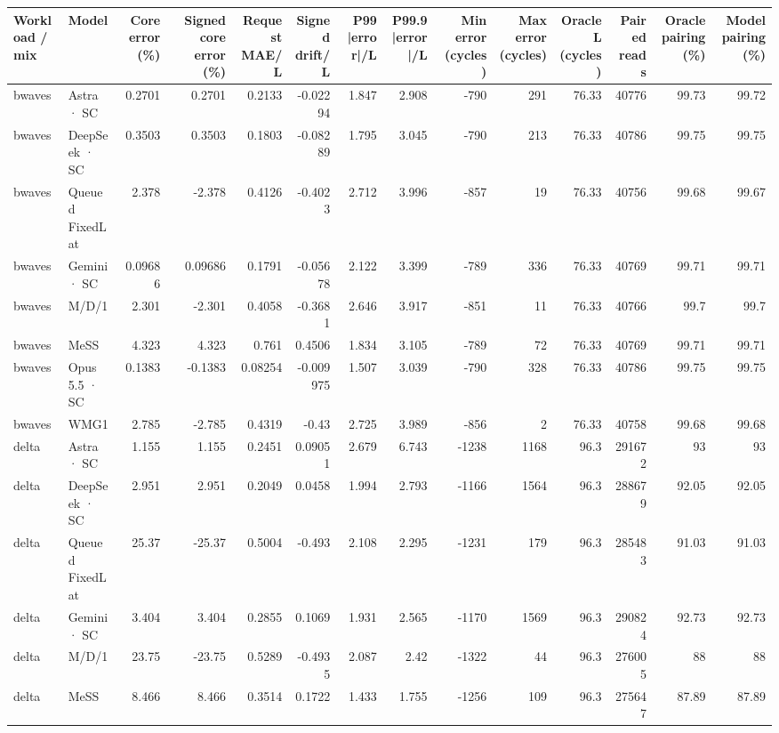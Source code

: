 \begin{tabular}{llrrrrrrrrrrrr}
\toprule
Workload / mix & Model & Core error (\%) & Signed core error (\%) & Request MAE/L & Signed drift/L & P99 |error|/L & P99.9 |error|/L & Min error (cycles) & Max error (cycles) & Oracle L (cycles) & Paired reads & Oracle pairing (\%) & Model pairing (\%) \\
\midrule
bwaves & Astra · SC & 0.2701 & 0.2701 & 0.2133 & -0.02294 & 1.847 & 2.908 & -790 & 291 & 76.33 & 40776 & 99.73 & 99.72 \\
bwaves & DeepSeek · SC & 0.3503 & 0.3503 & 0.1803 & -0.08289 & 1.795 & 3.045 & -790 & 213 & 76.33 & 40786 & 99.75 & 99.75 \\
bwaves & Queued FixedLat & 2.378 & -2.378 & 0.4126 & -0.4023 & 2.712 & 3.996 & -857 & 19 & 76.33 & 40756 & 99.68 & 99.67 \\
bwaves & Gemini · SC & 0.09686 & 0.09686 & 0.1791 & -0.05678 & 2.122 & 3.399 & -789 & 336 & 76.33 & 40769 & 99.71 & 99.71 \\
bwaves & M/D/1 & 2.301 & -2.301 & 0.4058 & -0.3681 & 2.646 & 3.917 & -851 & 11 & 76.33 & 40766 & 99.7 & 99.7 \\
bwaves & MeSS & 4.323 & 4.323 & 0.761 & 0.4506 & 1.834 & 3.105 & -789 & 72 & 76.33 & 40769 & 99.71 & 99.71 \\
bwaves & Opus 5.5 · SC & 0.1383 & -0.1383 & 0.08254 & -0.009975 & 1.507 & 3.039 & -790 & 328 & 76.33 & 40786 & 99.75 & 99.75 \\
bwaves & WMG1 & 2.785 & -2.785 & 0.4319 & -0.43 & 2.725 & 3.989 & -856 & 2 & 76.33 & 40758 & 99.68 & 99.68 \\
delta & Astra · SC & 1.155 & 1.155 & 0.2451 & 0.09051 & 2.679 & 6.743 & -1238 & 1168 & 96.3 & 291672 & 93 & 93 \\
delta & DeepSeek · SC & 2.951 & 2.951 & 0.2049 & 0.0458 & 1.994 & 2.793 & -1166 & 1564 & 96.3 & 288679 & 92.05 & 92.05 \\
delta & Queued FixedLat & 25.37 & -25.37 & 0.5004 & -0.493 & 2.108 & 2.295 & -1231 & 179 & 96.3 & 285483 & 91.03 & 91.03 \\
delta & Gemini · SC & 3.404 & 3.404 & 0.2855 & 0.1069 & 1.931 & 2.565 & -1170 & 1569 & 96.3 & 290824 & 92.73 & 92.73 \\
delta & M/D/1 & 23.75 & -23.75 & 0.5289 & -0.4935 & 2.087 & 2.42 & -1322 & 44 & 96.3 & 276005 & 88 & 88 \\
delta & MeSS & 8.466 & 8.466 & 0.3514 & 0.1722 & 1.433 & 1.755 & -1256 & 109 & 96.3 & 275647 & 87.89 & 87.89 \\

\end{tabular}
